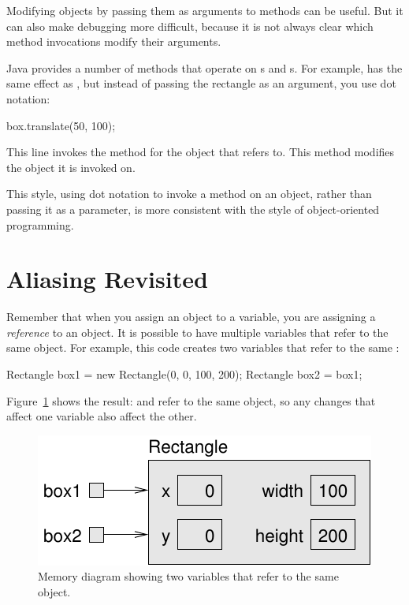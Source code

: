 
Modifying objects by passing them as arguments to methods can be useful.
But it can also make debugging more difficult, because it is not always clear which method invocations modify their arguments.

Java provides a number of methods that operate on s and s.
For example,  has the same effect as , but instead of passing the rectangle as an argument, you use dot notation:

\begin{code}
box.translate(50, 100);
\end{code}

This line invokes the  method for the object that  refers to.
This method modifies the  object it is invoked on.


This style, using dot notation to invoke a method on an object, rather than passing it as a parameter, is more consistent with the style of 
object-oriented programming.


\section{Aliasing Revisited}
\label{aliasing}


Remember that when you assign an object to a variable, you are assigning a {\em reference} to an object.
It is possible to have multiple variables that refer to the same object.
For example, this code creates two variables that refer to the same :

\begin{code}
Rectangle box1 = new Rectangle(0, 0, 100, 200);
Rectangle box2 = box1;
\end{code}

Figure~\ref{fig.aliasing} shows the result:  and  refer to the same object, so any changes that affect one variable also affect the other.

\begin{figure}[!ht]
\begin{center}
\includegraphics{figs/aliasing.pdf}
\caption{Memory diagram showing two variables that refer to the same  object.}
\label{fig.aliasing}
\end{center}
\end{figure}


